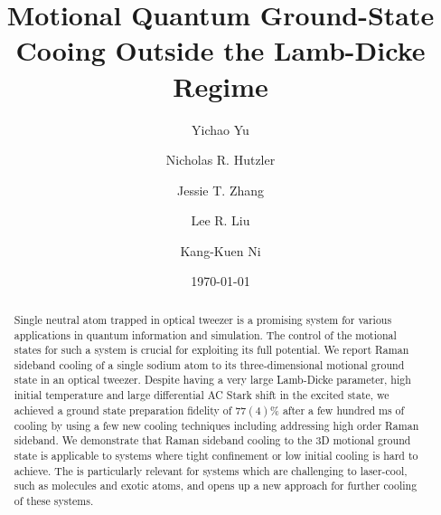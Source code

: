 \documentclass[aps,prl,twocolumn,groupedaddress]{revtex4-1}
\begin{document}
\title{Motional Quantum Ground-State Cooing Outside the Lamb-Dicke Regime}
\author{Yichao Yu}
\author{Nicholas R. Hutzler}
\author{Jessie T. Zhang}
\author{Lee R. Liu}
\author{Kang-Kuen Ni}

\date{\today}

\begin{abstract}
  Single neutral atom trapped in optical tweezer is a promising system for various applications
  in quantum information and simulation.
  The control of the motional states for such a system is crucial
  for exploiting its full potential.
  We report Raman sideband cooling of a single sodium atom to its three-dimensional
  motional ground state in an optical tweezer.
  Despite having a very large Lamb-Dicke parameter, high initial temperature and
  large differential AC Stark shift in the excited state,
  we achieved a ground state preparation fidelity of $77(4)\%$ after a few hundred ms of cooling
  by using a few new cooling techniques including addressing high order Raman sideband.
  We demonstrate that Raman sideband cooling to the 3D motional ground state is applicable to
  systems where tight confinement or low initial cooling is hard to achieve.
  The is particularly relevant for systems which are challenging to laser-cool,
  such as molecules and exotic atoms, and opens up a new approach for further cooling
  of these systems.
\end{abstract}

\maketitle
\end{document}
